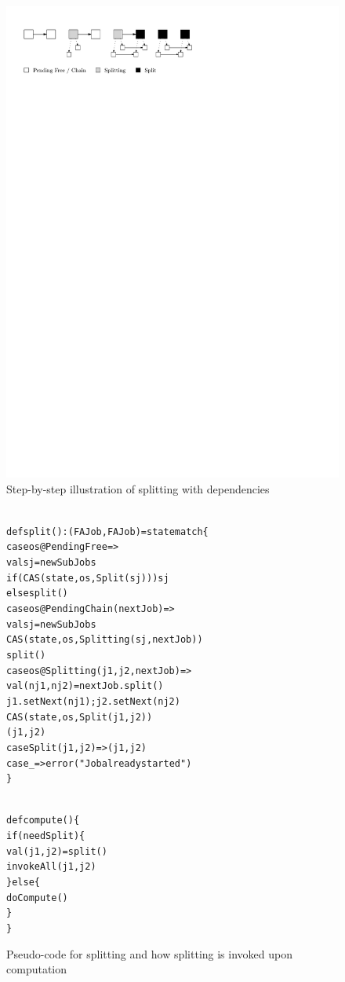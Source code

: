 \documentclass[runningheads,a4paper,fleqn]{llncs}
\begin{document}
\begin{figure}
  \centering
  \includegraphics{split}
  \caption{Step-by-step illustration of splitting with dependencies}
  \label{fig:split-ill}
\end{figure}

\begin{figure}
\begin{minipage}[t]{7cm}
\begin{alltt}
{\scriptsize
def split(): (FAJob, FAJob) = state match \{
  case os@PendingFree =>
    val sj = newSubJobs
    if (CAS(state, os, Split(sj))) sj
    else split()
  case os@PendingChain(nextJob) =>
    val sj = newSubJobs
    CAS(state, os, Splitting(sj, nextJob))
    split()
  case os@Splitting(j1, j2, nextJob) =>
    val (nj1, nj2) = nextJob.split()
    j1.setNext(nj1); j2.setNext(nj2)
    CAS(state, os, Split(j1, j2))
    (j1, j2)
  case Split(j1, j2) => (j1, j2)
  case _ => error("Job already started")
\}
}
\end{alltt}
\end{minipage}
\begin{minipage}[t]{4cm}
\begin{alltt}
{\scriptsize
def compute() \{
  if (needSplit) \{
    val (j1, j2) = split()
    invokeAll(j1, j2)
  \} else \{
    doCompute()
  \}
\}
}
\end{alltt}
\end{minipage}
\caption{Pseudo-code for splitting and how splitting is invoked upon
  computation}
\label{fig:split-code}
\end{figure}
\end{document}
